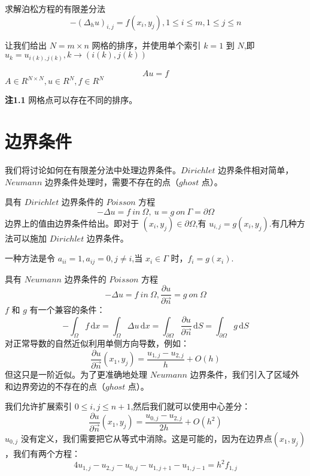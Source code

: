 \documentclass[12pt,a4paper]{article}
\begin{document}
求解泊松方程的有限差分法
\begin{equation}
-(\Delta _h u)_{i,j}=f(x_i,y_j),1\le i\le m,1\le j\le n
\end{equation}

让我们给出 $N=m\times n$ 网格的排序，并使用单个索引 $k=1$ 到 $N$,即 $u_k=u_{i(k),j(k)},k\rightarrow (i(k),j(k))$ 

\begin{equation}
Au=f
\end{equation}
$A\in R^{N\times N},u\in R^N,f\in R^N$

\textbf{注1.1}
网格点可以存在不同的排序。

\section{边界条件}
我们将讨论如何在有限差分法中处理边界条件。$Dirichlet$ 边界条件相对简单，$Neumann$ 边界条件处理时，需要不存在的点（$ghost$ 点）。

具有 $Dirichlet$ 边界条件的 $Poisson$ 方程
\begin{equation}
-\Delta u=f ~in~ \Omega ,~u=g ~on~ \Gamma =\partial\Omega
\end{equation}
边界上的值由边界条件给出。即对于 $(x_i,y_j)\in\partial\Omega$,有 $u_{i,j}=g(x_i,y_j)$.有几种方法可以施加 $Dirichlet$ 边界条件。

一种方法是令 $a_{ii}=1,a_{ij}=0,j\ne i$,当 $x_i\in\Gamma$ 时，$f_i=g(x_i)$.

具有 $Neumann$ 边界条件的 $Poisson$ 方程
$$
-\Delta u=f ~in~ \Omega ,\frac{\partial u}{\partial\overrightarrow{n}}=g ~ on ~\Omega
$$
$f$ 和 $g$ 有一个兼容的条件：
\begin{equation}
-\int_{\Omega} f\, \mathrm{d}x=\int_{\Omega} \Delta u\, \mathrm{d}x=\int_{\partial\Omega}\frac{\partial u}{\partial\overrightarrow{n}}\, \mathrm{d}S=\int_{\partial\Omega} g\, \mathrm{d}S
\end{equation}
对正常导数的自然近似利用单侧方向导数，例如：
$$
\frac{\partial u}{\partial\overrightarrow{n}}(x_1,y_j)=\frac{u_{1,j}-u_{2,j}}{h}+O(h)
$$
但这只是一阶近似。为了更准确地处理 $Neumann$ 边界条件，我们引入了区域外和边界旁边的不存在的点（$ghost$ 点）。

我们允许扩展索引 $0\le i,j\le n+1$,然后我们就可以使用中心差分：
$$
\frac{\partial u}{\partial\overrightarrow{n}}(x_1,y_j)=\frac{u_{0,j}-u_{2,j}}{2h}+O(h^2)
$$
$u_{0,j}$ 没有定义，我们需要把它从等式中消除。这是可能的，因为在边界点$(x_1,y_j)$，我们有两个方程：
\begin{equation}
4u_{1,j}-u_{2,j}-u_{0,j}-u_{1,j+1}-u_{1,j-1}=h^2f_{1,j}
\end{equation}
\end{document}
